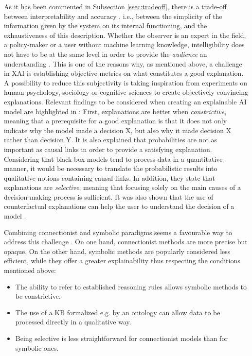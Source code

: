 \documentclass[final]{elsarticle}
\begin{document}
As it has been commented in Subsection \ref{ssec:tradeoff}, there is a trade-off between interpretability and accuracy \cite{Gilpin18}, i.e., between the simplicity of the information given by the system on its internal functioning, and the exhaustiveness of this description. Whether the observer is an expert in the field, a policy-maker or a user without machine learning knowledge, intelligibility does not have to be at the same level in order to provide the \textit{audience} an understanding \cite{Preece18Stakeholders}. This is one of the reasons why, as mentioned above, a challenge in XAI is establishing objective metrics on what constitutes a good explanation. A possibility to reduce this subjectivity is taking inspiration from experiments on human psychology, sociology or cognitive sciences to create objectively convincing explanations. Relevant findings to be considered when creating an explainable AI model are highlighted in \cite{Miller19}: First, explanations are better when \textit{constrictive}, meaning that a prerequisite for a good explanation is that it does not only indicate why the model made a decision X, but also why it made decision X rather than decision Y. It is also explained that probabilities are not as important as causal links in order to provide a satisfying explanation. Considering that black box models tend to process data in a quantitative manner, it would be necessary to translate the probabilistic results into qualitative notions containing causal links. In addition, they state that explanations are \textit{selective}, meaning that focusing solely on the main causes of a decision-making process is sufficient. It was also shown that the use of counterfactual explanations can help the user to understand the decision of a model \cite{goudet2018learning, Lopez-Paz17, Byrne19}.

Combining connectionist and symbolic paradigms seems a favourable way to address this challenge \cite{Bennetot19,dAvilaGarcez19NeSy,garnelo2016towards,garnelo2019reconciling,marra2019integrating}. On one hand, connectionist methods are more precise but opaque. On the other hand, symbolic methods are popularly considered less efficient, while they offer a greater explainability thus respecting the conditions mentioned above:
\begin{itemize}[leftmargin=*]
    \item The ability to refer to established reasoning rules allows symbolic methods to be constrictive.
    \item The use of a KB formalized e.g. by an ontology can allow data to be processed directly in a qualitative way.
    \item Being selective is less straightforward for connectionist models than for symbolic ones. 
\end{itemize}
\end{document}
